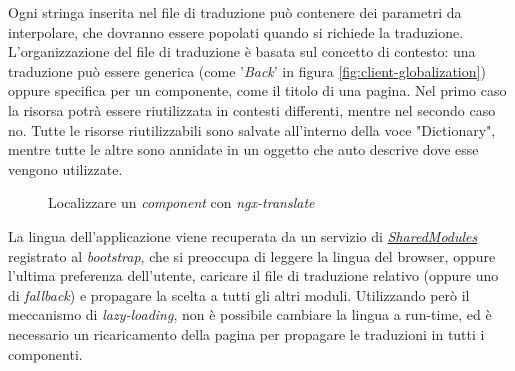 \noindent
Ogni stringa inserita nel file di traduzione può contenere dei parametri da interpolare, che dovranno essere popolati quando si richiede la traduzione. L'organizzazione del file di traduzione è basata sul concetto di contesto: una traduzione può essere generica (come '\textit{Back}' in figura \ref{fig:client-globalization}) oppure specifica per un componente, come il titolo di una pagina. Nel primo caso la risorsa potrà essere riutilizzata in contesti differenti, mentre nel secondo caso no. Tutte le risorse riutilizzabili sono salvate all'interno della voce "Dictionary", mentre tutte le altre sono annidate in un oggetto che auto descrive dove esse vengono utilizzate.

 \begin{figure}[H] 
	\centering    
	
	\caption[Localizzare un \textit{component} con \textit{ngx-translate}]{Localizzare un \textit{component} con \textit{ngx-translate}}
	\label{fig:client-ngxtranslate}
\end{figure}

\noindent
La lingua dell'applicazione viene recuperata da un servizio di \hyperref[client:shared-module]{\textit{SharedModules}} registrato al \textit{bootstrap}, che si preoccupa di leggere la lingua del browser, oppure l'ultima preferenza dell'utente, caricare il file di traduzione relativo (oppure uno di \textit{fallback}) e propagare la scelta a tutti gli altri moduli. Utilizzando però il meccanismo di \textit{lazy-loading}, non è possibile cambiare la lingua a run-time, ed è necessario un ricaricamento della pagina per propagare le traduzioni in tutti i componenti.
